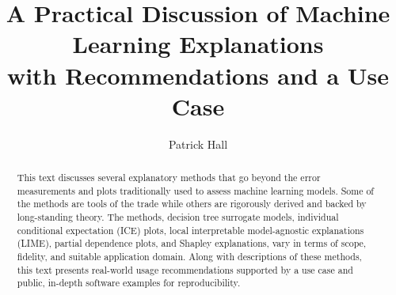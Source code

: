 \documentclass[sigconf, review]{acmart}
\begin{document}
%
\title[Machine Learning Explanations]{A Practical Discussion of Machine Learning Explanations\\ with Recommendations and a Use Case}

%
\author{Patrick Hall}

\renewcommand{\shortauthors}{Hall, Patrick}

%
\begin{abstract}
This text discusses several explanatory methods that go beyond the error measurements and plots 	traditionally used to assess machine learning models. Some of the methods are tools of the trade while others are rigorously derived and backed by long-standing theory. The methods, decision tree surrogate models, individual conditional expectation (ICE) plots, local interpretable model-agnostic explanations (LIME), partial dependence plots, and Shapley explanations, vary in terms of scope, fidelity, and suitable application domain.  Along with descriptions of these methods, this text presents real-world usage recommendations supported by a use case and public, in-depth software examples for reproducibility.
\end{abstract}
\end{document}
